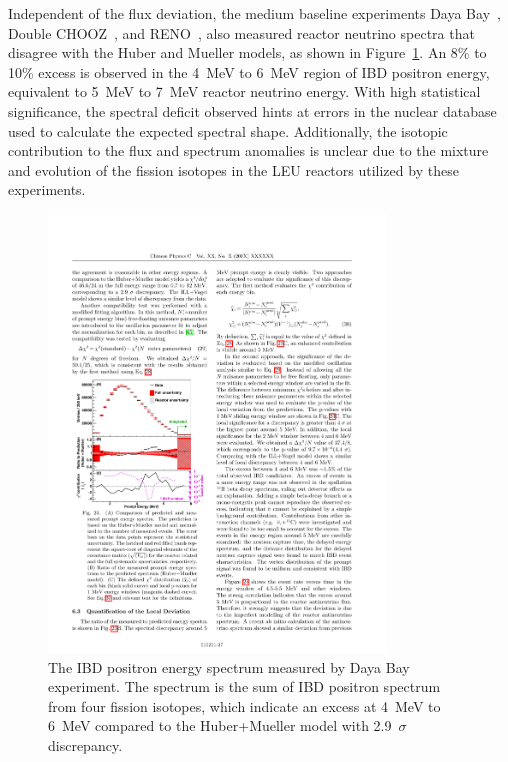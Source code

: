     Independent of the flux deviation, the medium baseline experiments Daya Bay~\cite{bib:DYBSpectrum}, Double CHOOZ~\cite{bib:DBChooz}, and RENO~\cite{bib:RENO}, also measured reactor neutrino spectra that disagree	 with the Huber and Mueller models, as shown in Figure~\ref{fig:DYBSpectrum}.
    An 8\% to 10\% excess is observed in the 4~MeV to 6~MeV region of IBD positron energy, equivalent to 5~MeV to 7~MeV reactor neutrino energy.
    With high statistical significance, the spectral deficit observed hints at errors in the nuclear database used to calculate the expected spectral shape.
    Additionally, the isotopic contribution to the flux and spectrum anomalies is unclear due to the mixture and evolution of the fission isotopes in the LEU reactors utilized by these experiments.
 \begin{figure}[h!]
    \centering
    \includegraphics[width=0.8\textwidth]{Figures/DYBSpectrum.pdf}
    \caption[Daya Bay IBD positron energy spectrum]{The IBD positron energy spectrum measured by Daya Bay experiment.
    The spectrum is the sum of IBD positron spectrum from four fission isotopes, which indicate an excess at 4~MeV to 6~MeV compared to the Huber+Mueller model with 2.9~$\sigma$ discrepancy.}
    \label{fig:DYBSpectrum}
    
\end{figure} 
    
